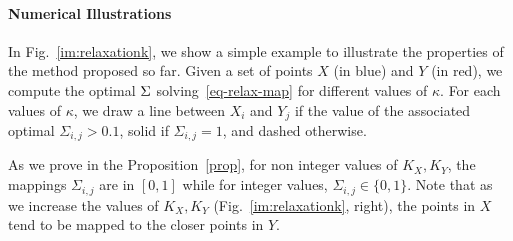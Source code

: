 \paragraph{Numerical Illustrations}

In Fig.~\ref{im:relaxationk}, we show a simple example to illustrate the properties of the method proposed so far. Given a set of points $X$ (in blue) and $Y$ (in red), we compute the optimal $\Sigma$ solving~\eqref{eq-relax-map} for different values of $\kappa$. For each values of $\kappa$, we draw a line between $X_i$ and $Y_j$ if the value of the associated optimal $\Sigma_{i,j} > 0.1$, solid if $\Sigma_{i,j}=1$, and dashed otherwise.

As we prove in the Proposition~\ref{prop}, for non integer values of $K_X,K_Y$, the mappings $\Sigma_{i,j}$ are in $[0,1]$ while for integer values, $\Sigma_{i,j} \in \{0,1\}$. Note that as we increase the values of $K_X,K_Y$ (Fig.~\ref{im:relaxationk}, right), the points in $X$ tend to be mapped to the closer points in $Y$.




